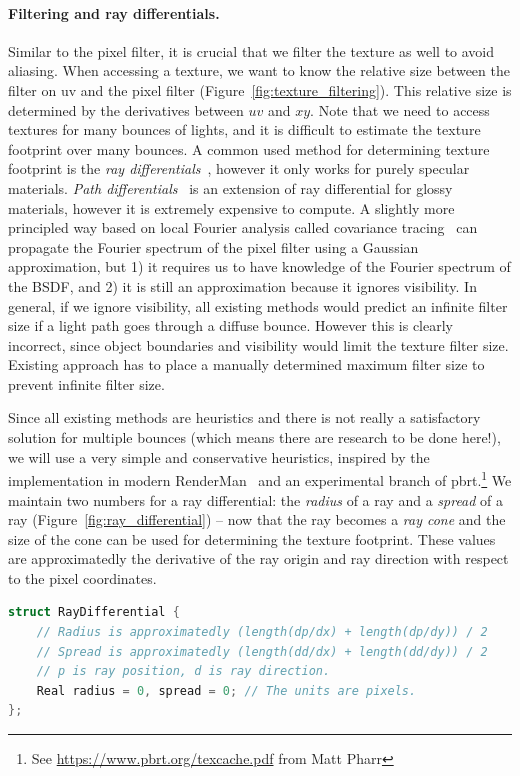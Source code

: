 \documentclass{article}
\begin{document}
\paragraph{Filtering and ray differentials.} Similar to the pixel filter, it is crucial that we filter the texture as well to avoid aliasing. When accessing a texture, we want to know the relative size between the filter on uv and the pixel filter (Figure~\ref{fig:texture_filtering}). This relative size is determined by the derivatives between $uv$ and $xy$. Note that we need to access textures for many bounces of lights, and it is difficult to estimate the texture footprint over many bounces. A common used method for determining texture footprint is the \emph{ray differentials}~\cite{Igehy:1999:TRD}, however it only works for purely specular materials. \emph{Path differentials}~\cite{Suykens:2001:PDA} is an extension of ray differential for glossy materials, however it is extremely expensive to compute. A slightly more principled way based on local Fourier analysis called covariance tracing~\cite{Belcour:2017:ACG} can propagate the Fourier spectrum of the pixel filter using a Gaussian approximation, but 1) it requires us to have knowledge of the Fourier spectrum of the BSDF, and 2) it is still an approximation because it ignores visibility. In general, if we ignore visibility, all existing methods would predict an infinite filter size if a light path goes through a diffuse bounce. However this is clearly incorrect, since object boundaries and visibility would limit the texture filter size. Existing approach has to place a manually determined maximum filter size to prevent infinite filter size.

Since all existing methods are heuristics and there is not really a satisfactory solution for multiple bounces (which means there are research to be done here!), we will use a very simple and conservative heuristics, inspired by the implementation in modern RenderMan~\cite{Christensen:2018:RAP} and an experimental branch of pbrt.\footnote{See \href{THE IMPLEMENTATION OF A SCALABLE TEXTURE CACHE}{https://www.pbrt.org/texcache.pdf} from Matt Pharr} We maintain two numbers for a ray differential: the \emph{radius} of a ray and a \emph{spread} of a ray (Figure~\ref{fig:ray_differential}) -- now that the ray becomes a \emph{ray cone} and the size of the cone can be used for determining the texture footprint. These values are approximatedly the derivative of the ray origin and ray direction with respect to the pixel coordinates.
\begin{lstlisting}[language=c++]
struct RayDifferential {
    // Radius is approximatedly (length(dp/dx) + length(dp/dy)) / 2
    // Spread is approximatedly (length(dd/dx) + length(dd/dy)) / 2
    // p is ray position, d is ray direction.
    Real radius = 0, spread = 0; // The units are pixels.
};
\end{lstlisting}
\end{document}

